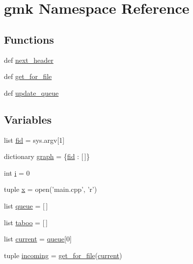 \hypertarget{namespacegmk}{\section{gmk Namespace Reference}
\label{namespacegmk}
}
\subsection*{Functions}
\begin{DoxyCompactItemize}
\item 
def \hyperlink{namespacegmk_aeb704d04246c762a02775926682797aa}{next\-\_\-header}
\item 
def \hyperlink{namespacegmk_a7dc1f8ee527a75417b4af9cf68490352}{get\-\_\-for\-\_\-file}
\item 
def \hyperlink{namespacegmk_a89cafb99ddb6201733d0ffa136f7e557}{update\-\_\-queue}
\end{DoxyCompactItemize}
\subsection*{Variables}
\begin{DoxyCompactItemize}
\item 
list \hyperlink{namespacegmk_a29c54310ed5d6c9d85f4ed018c7cc07c}{fid} = sys.\-argv\mbox{[}1\mbox{]}
\item 
dictionary \hyperlink{namespacegmk_a2be856cc48bb4565e8b772d6a27df1f1}{graph} = \{\hyperlink{namespacegmk_a29c54310ed5d6c9d85f4ed018c7cc07c}{fid} \-: \mbox{[}$\,$\mbox{]}\}
\item 
int \hyperlink{namespacegmk_a9184966e48659fd84c1d7c1407d263df}{i} = 0
\item 
tuple \hyperlink{namespacegmk_a1fd0b3028c3238f93be9ee0080027025}{x} = open('main.\-cpp', 'r')
\item 
list \hyperlink{namespacegmk_a58e2fe1e23b8e790d8d497d460d2bf7b}{queue} = \mbox{[}$\,$\mbox{]}
\item 
list \hyperlink{namespacegmk_a86d641bddd418bd61985965f537878dc}{taboo} = \mbox{[}$\,$\mbox{]}
\item 
list \hyperlink{namespacegmk_a4a4fbb8f70406eba80376b46aacdc47d}{current} = \hyperlink{namespacegmk_a58e2fe1e23b8e790d8d497d460d2bf7b}{queue}\mbox{[}0\mbox{]}
\item 
tuple \hyperlink{namespacegmk_a49fcde59011710713b0cacfb83b655b1}{incoming} = \hyperlink{namespacegmk_a7dc1f8ee527a75417b4af9cf68490352}{get\-\_\-for\-\_\-file}(\hyperlink{namespacegmk_a4a4fbb8f70406eba80376b46aacdc47d}{current})
\end{DoxyCompactItemize}


